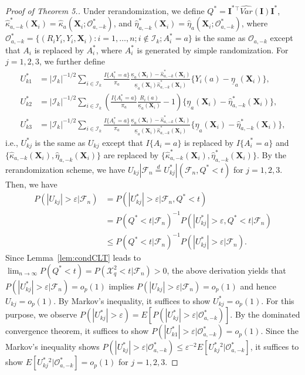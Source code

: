 \documentclass[12pt]{article}
\newcommand{\bX}{\boldsymbol{X}}
\newcommand{\bI}{\boldsymbol{I}}
\begin{document}
\begin{proof}[Proof of Theorem 5.]
Under rerandomization, we define $Q^*=\bI^*{}^\top \widehat{Var}(\bI) \bI^*$, $\widehat{\kappa} _{a,-k}^*(\bX_i) = \widehat{\kappa} _a(\bX_i; \mathcal{O}^*_{a,-k})$, and $\widehat{\eta} _{a,-k}^*(\bX_i) = \widehat{\eta}_a(\bX_i; \mathcal{O}^*_{a, -k})$, where $\mathcal{O}_{a,-k}^* = \{(R_iY_i,Y_i,\bX_i): i = 1,\dots, n;i \notin \mathcal{I}_k; A_i^* =a\}$  is the same as $\mathcal{O}_{a,-k}$ except that $A_i$ is replaced by $A_i^*$, where $A_i^*$ is generated by simple randomization. 
For $j= 1,2,3$, we further define 
\begin{align*}
    U_{k1}^* &= |\mathcal{I}_k|^{-1/2} \sum_{i \in \mathcal{I}_k} \frac{I\{A_i^*=a\}}{\pi_a} \frac{\underline{\kappa}_a(\bX_i) - \widehat{\kappa}_{a,-k}^*(\bX_i)}{\underline{\kappa}_a(\bX_i)\widehat{\kappa}_{a,-k}^*(\bX_i)}\{Y_i(a) - \underline{\eta}_a(\bX_i)\},\\
    U_{k2}^* &= |\mathcal{I}_k|^{-1/2} \sum_{i \in \mathcal{I}_k} \left(\frac{I\{A_i^*=a\}}{\pi_a} \frac{R_i(a)}{\underline{\kappa}_a(\bX_i)}-1\right)  \{\underline{\eta}_a(\bX_i)-\widehat{\eta}_{a,-k}^*(\bX_i)\},\\
    U_{k3}^* &= |\mathcal{I}_k|^{-1/2} \sum_{i \in \mathcal{I}_k} \frac{I\{A_i^*=a\}}{\pi_a} \frac{\underline{\kappa}_a(\bX_i) - \widehat{\kappa} _{a,-k}^*(\bX_i)}{\underline{\kappa}_a(\bX_i)\widehat{\kappa}_{a,-k}^*(\bX_i)}\{\underline{\eta}_{a}(\bX_i)-\widehat{\eta}_{a,-k}^*(\bX_i)\}, 
\end{align*}
i.e., $U^*_{kj}$ is the same as $U_{kj}$ except that $I\{A_i=a\}$ is replaced by $I\{A^*_i=a\}$ and $\{\widehat{\kappa}_{a,-k}(\bX_i), \widehat{\eta}_{a,-k}(\bX_i)\}$ are replaced by $\{\widehat{\kappa}_{a,-k}^*(\bX_i), \widehat{\eta}_{a,-k}^*(\bX_i)\}$. By the rerandomization scheme, we have $U_{kj}|\mathcal{F}_n\overset{d}{=} U^*_{kj}|( \mathcal{F}_n, Q^* < t)$ for $j=1,2,3$. 
Then, we have
\begin{align*}
   P(|U_{kj}|> \varepsilon|\mathcal{F}_n) &= P(|U_{kj}^*|> \varepsilon|\mathcal{F}_n, Q^*<t)\\
   &= P(Q^*<t|\mathcal{F}_n)^{-1} P(|U_{kj}^*|> \varepsilon, Q^*<t|\mathcal{F}_n) \\
   &\le  P(Q^*<t|\mathcal{F}_n)^{-1} P(|U_{kj}^*|> \varepsilon|\mathcal{F}_n).
\end{align*}
Since Lemma~\ref{lem:condCLT} leads to $\lim_{n \rightarrow \infty}P(Q^*<t) = P(\mathcal{X}^2_q < t|\mathcal{F}_n) > 0$, the above derivation yields that $P(|U_{kj}^*|> \varepsilon|\mathcal{F}_n) = o_p(1)$ implies $P(|U_{kj}|> \varepsilon|\mathcal{F}_n) =o_p(1)$ and hence $U_{kj} = o_p(1)$. By Markov's inequality, it suffices to show $U_{kj}^* = o_p(1)$. For this purpose, we observe $P(|U_{kj}^*|> \varepsilon) = E[P(|U_{kj}^*|> \varepsilon|\mathcal{O}^*_{a,-k})]$. By the dominated convergence theorem, it suffices to show $P(|U_{k1}^*|> \varepsilon|\mathcal{O}^*_{a,-k}) = o_p(1)$. Since the Markov's inequality shows $P(|U_{kj}^*|> \varepsilon|\mathcal{O}^*_{a,-k}) \le \varepsilon^{-2} E[U_{kj}^*{}^2|\mathcal{O}^*_{a,-k}]$, it suffices to show $E[U_{kj}^*{}^2|\mathcal{O}^*_{a,-k}] = o_p(1)$ for $j=1,2,3$.


\end{proof}
\end{document}
